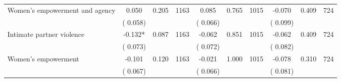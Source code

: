 \begin{tabular}{l*{9}{c}}
 Women's empowerment and agency                &              0.050        &        0.205 & 1163        &              0.085 &        0.765 & 1015               &       -0.070 &        0.409 & 724       \\ 
                               &        (       0.058) & &                                                                &       (       0.066) & &                                                         &       (       0.099) & & \\ 
 Intimate partner violence                &             -0.132*        &        0.087 & 1163        &             -0.062 &        0.851 & 1015               &       -0.062 &        0.409 & 724       \\ 
                               &        (       0.073) & &                                                                &       (       0.072) & &                                                         &       (       0.082) & & \\ 
 Women's empowerment                &             -0.101        &        0.120 & 1163        &             -0.021 &        1.000 & 1015               &       -0.078 &        0.310 & 724       \\ 
                               &        (       0.067) & &                                                                &       (       0.066) & &                                                         &       (       0.081) & & \\ 
\hline \end{tabular}                                                                                                                                                      